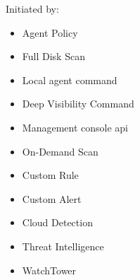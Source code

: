 \begin{multicols}{2}
      Initiated by:
      \begin{itemize}
            \item Agent Policy
            \item Full Disk Scan
            \item Local agent command
            \item Deep Visibility Command
            \item Management console \acrshort{api}
            \item On-Demand Scan
            \item Custom Rule
            \item Custom Alert
            \item Cloud Detection
            \item Threat Intelligence
            \item WatchTower
      \end{itemize}


\end{multicols}
